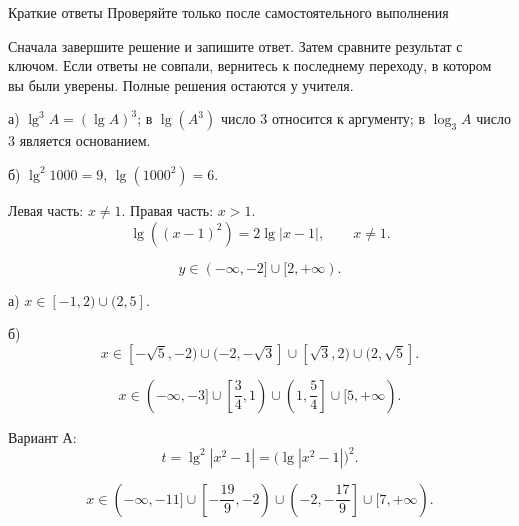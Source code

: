 \newpage
\homeworktitle
  {Краткие ответы}
  {Проверяйте только после самостоятельного выполнения}

\begin{selfcheck}
  Сначала завершите решение и запишите ответ. Затем сравните результат с
  ключом. Если ответы не совпали, вернитесь к последнему переходу, в котором
  вы были уверены. Полные решения остаются у учителя.
\end{selfcheck}

\begin{answerkeybox}[Задание 1]
  а) \(\lg^3 A=(\lg A)^3\); в \(\lg(A^3)\) число \(3\) относится к
  аргументу; в \(\log_3 A\) число \(3\) является основанием.

  б) \(\lg^2 1000=9\), \(\lg(1000^2)=6\).
\end{answerkeybox}

\begin{answerkeybox}[Задание 2]
  Левая часть: \(x\ne1\). Правая часть: \(x>1\).
  \[
    \lg((x-1)^2)=2\lg|x-1|,\qquad x\ne1.
  \]
\end{answerkeybox}

\begin{answerkeybox}[Задание 3]
  \[
    y\in(-\infty,-2]\cup[2,+\infty).
  \]
\end{answerkeybox}

\begin{answerkeybox}[Задание 4]
  а) \(x\in[-1,2)\cup(2,5]\).

  б)
  \[
    x\in[-\sqrt5,-2)\cup(-2,-\sqrt3]
    \cup[\sqrt3,2)\cup(2,\sqrt5].
  \]
\end{answerkeybox}

\begin{answerkeybox}[Задание 5]
  \[
    x\in(-\infty,-3]
    \cup\left[\frac34,1\right)
    \cup\left(1,\frac54\right]
    \cup[5,+\infty).
  \]
\end{answerkeybox}

\begin{answerkeybox}[Задание 6]
  Вариант А:
  \[
    t=\lg^2|x^2-1|=\bigl(\lg|x^2-1|\bigr)^2.
  \]
\end{answerkeybox}

\begin{answerkeybox}[Задание 7]
  \[
    x\in(-\infty,-11]
    \cup\left[-\frac{19}{9},-2\right)
    \cup\left(-2,-\frac{17}{9}\right]
    \cup[7,+\infty).
  \]
\end{answerkeybox}

